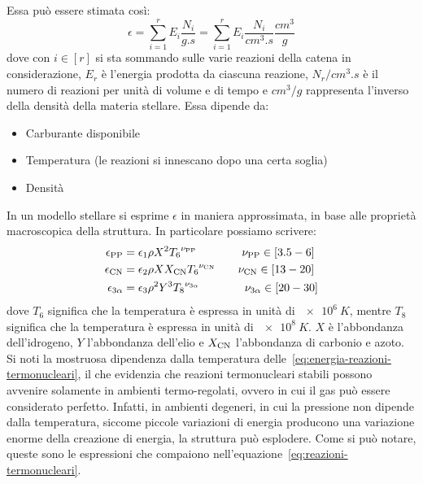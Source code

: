 Essa può essere stimata così:
\begin{equation}
    \epsilon = \sum_{i=1}^{r} E_i \dfrac{N_i}{\si{g.s}} = \sum_{i=1}^{r} E_i \dfrac{N_i}{\si{cm^3.s}} \dfrac{\si{cm^3}}{\si{g}}
\end{equation}
dove con $i \in [r]$ si sta sommando sulle varie reazioni della catena in considerazione, $E_r$ è l'energia prodotta da ciascuna reazione, $N_r/\si{cm^3.s}$ è il numero di reazioni per unità di volume e di tempo e $\si{cm^3} / \si{g}$ rappresenta l'inverso della densità della materia stellare. Essa dipende da:
\begin{itemize}
    \item Carburante disponibile
    \item Temperatura (le reazioni si innescano dopo una certa soglia)
    \item Densità
\end{itemize}

In un modello stellare si esprime $\epsilon$ in maniera approssimata, in base alle proprietà macroscopica della struttura. In particolare possiamo scrivere:
\begin{subequations}
\label{eq:energia-reazioni-termonucleari}
\begin{align}
\epsilon_\textup{PP} &= \epsilon_1 \rho X^2 {T_6}^{\nu_\textup{PP}} \qquad \qquad \nu_\textup{PP} \in [3.5 - 6] \label{eq:energia-PP}\\
\epsilon_\textup{CN} &= \epsilon_2 \rho X X_\textup{CN} {T_6}^{\nu_\textup{CN}} \qquad \nu_\textup{CN} \in [13 - 20] \label{eq:energia-CN}\\
\epsilon_{3\alpha} &= \epsilon_3 \rho^2 Y^3 {T_8}^{\nu_{3\alpha}} \qquad \qquad \nu_{3 \alpha} \in [20 - 30] \label{eq:energia-3A}
\end{align}
\end{subequations}
dove $T_6$ significa che la temperatura è espressa in unità di $\SI{e6}{K}$, mentre $T_8$ significa che la temperatura è espressa in unità di $\SI{e8}{K}$. $X$ è l'abbondanza dell'idrogeno, $Y$ l'abbondanza dell'elio e $X_\textup{CN}$ l'abbondanza di carbonio e azoto. Si noti la mostruosa dipendenza dalla temperatura delle~\eqref{eq:energia-reazioni-termonucleari}, il che evidenzia che reazioni termonucleari stabili possono avvenire solamente in ambienti termo-regolati, ovvero in cui il gas può essere considerato perfetto. Infatti, in ambienti degeneri, in cui la pressione non dipende dalla temperatura, siccome piccole variazioni di energia producono una variazione enorme della creazione di energia, la struttura può esplodere. Come si può notare, queste sono le espressioni che compaiono nell'equazione~\eqref{eq:reazioni-termonucleari}. 

